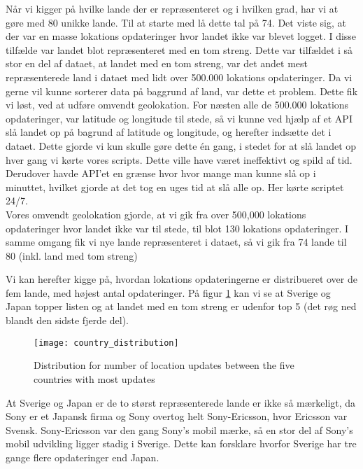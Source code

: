 Når vi kigger på hvilke lande der er repræsenteret og i hvilken grad, har vi at gøre med 80 unikke lande. Til at starte med lå dette tal på 74. Det viste sig, at der var en masse lokations opdateringer hvor landet ikke var blevet logget. I disse tilfælde var landet blot repræsenteret med en tom streng. Dette var tilfældet i så stor en del af dataet, at landet med en tom streng, var det andet mest repræsenterede land i dataet med lidt over 500.000 lokations opdateringer. 
Da vi gerne vil kunne sorterer data på baggrund af land, var dette et problem. Dette fik vi løst, ved at udføre omvendt geolokation. For næsten alle de 500.000 lokations opdateringer, var latitude og longitude til stede, så vi kunne ved hjælp af et API\cite{reversegeocode} slå landet op på bagrund af latitude og longitude, og herefter indsætte det i dataet. Dette gjorde vi kun skulle gøre dette én gang, i stedet for at slå landet op hver gang vi kørte vores scripts. Dette ville have været ineffektivt og spild af tid. Derudover havde API'et en grænse hvor hvor mange man kunne slå op i minuttet, hvilket gjorde at det tog en uges tid at slå alle op. Her kørte scriptet 24/7. \\ 
Vores omvendt geolokation gjorde, at vi gik fra over 500,000 lokations opdateringer hvor landet ikke var til stede, til blot 130 lokations opdateringer. I samme omgang fik vi nye lande repræsenteret i dataet, så vi gik fra 74 lande til 80 (inkl. land med tom streng)

Vi kan herefter kigge på, hvordan lokations opdateringerne er distribueret over de fem lande, med højest antal opdateringer. På figur \ref{fig:country_dist} kan vi se at Sverige og Japan topper listen og at landet med en tom streng er udenfor top 5 (det røg ned blandt den sidste fjerde del).


\begin{figure}[H]
    \hspace*{-1.0cm}
    \centering
    \texttt{[image: country\_distribution]}
    \caption{Distribution for number of location updates between the five countries with most updates}
    \label{fig:country_dist}
\end{figure}


At Sverige og Japan er de to størst repræsenterede lande er ikke så mærkeligt, da Sony er et Japansk firma og Sony overtog helt Sony-Ericsson, hvor Ericsson var Svensk. Sony-Ericsson var den gang Sony's mobil mærke, så en stor del af Sony's mobil udvikling ligger stadig i Sverige. Dette kan forsklare hvorfor Sverige har tre gange flere opdateringer end Japan.  

